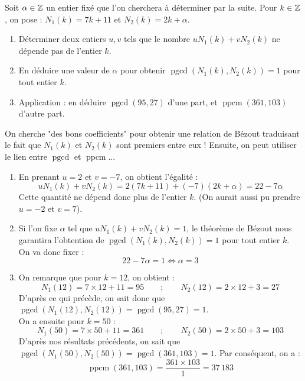 \documentclass[11pt,class=report,crop=false]{standalone}
\newcommand{\pgcd}{\mathop{\mathrm{pgcd}}\nolimits}
\newcommand{\ppcm}{\mathop{\mathrm{ppcm}}\nolimits}
\begin{document}
\exercice{}
\enonce
Soit $\alpha \in \mathbb{Z}$ un entier fixé que l'on cherchera à déterminer par la suite. Pour $k \in \mathbb{Z}$, on pose : $N_1(k) = 7k+11$ et $N_2(k) = 2k + \alpha$.
\begin{enumerate}
    \item Déterminer deux entiers $u,v$ tels que le nombre $u N_1(k) + v N_2(k)$ ne dépende pas de l'entier $k$.
    
    \item En déduire une valeur de $\alpha$ pour obtenir $\pgcd(N_1(k) , N_2(k)) = 1$ pour tout entier $k$.
    
    \item Application : en déduire $\pgcd(95,27)$ d'une part, et $\ppcm(361,103)$ d'autre part.
\end{enumerate}
\finenonce

\indication
On cherche "des bons coefficients" pour obtenir une relation de Bézout traduisant le fait que $N_1(k)$ et $N_2(k)$ sont premiers entre eux ! Ensuite, on peut utiliser le lien entre $\pgcd$ et $\ppcm$...
\finindication

\correction
\sauteligne
\begin{enumerate}
    \item En prenant $u = 2$ et $v = -7$, on obtient l'égalité :
    $$ u N_1(k) + v N_2(k) = 2 ( 7k+11) + (-7) ( 2k + \alpha) = 22 - 7 \alpha $$
    Cette quantité ne dépend donc plus de l'entier $k$. (On aurait aussi pu prendre $u=-2$ et $v=7$).
    
    \item Si l'on fixe $\alpha$ tel que $ u N_1(k) + v N_2(k) = 1$, le théorème de Bézout nous garantira l'obtention de $\pgcd(N_1(k) , N_2(k)) = 1$ pour tout entier $k$. On va donc fixer :
    $$ 22 - 7 \alpha = 1 \iff \alpha = 3 $$
    
    \item On remarque que pour $k=12$, on obtient :
    $$ N_1(12) = 7 \times 12 + 11 = 95 \qquad ; \qquad N_2(12) = 2 \times 12 + 3 = 27 $$
    D'après ce qui précède, on sait donc que $\pgcd(N_1(12) , N_2(12)) = \pgcd(95,27) = 1$.\\
    On a ensuite pour $k = 50$ :
    $$ N_1(50) = 7 \times 50 + 11 = 361 \qquad ; \qquad N_2(50) = 2 \times 50 + 3 = 103 $$
    D'après nos résultats précédents, on sait que $\pgcd(N_1(50) , N_2(50)) = \pgcd(361,103) = 1$. Par conséquent, on a :
    $$ \ppcm (361,103) = \frac{361 \times 103}{1} = 37\, 183 $$
\end{enumerate}
\fincorrection
\finexercice
\end{document}
